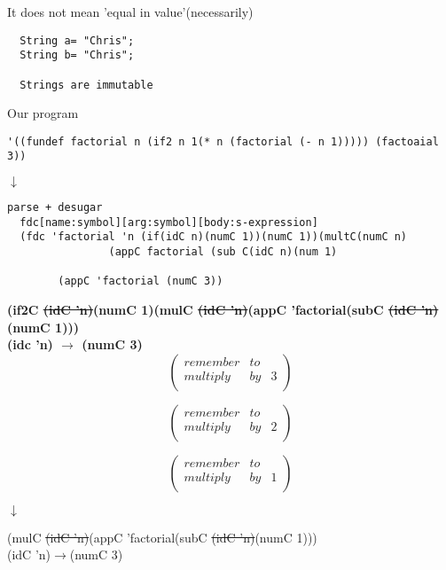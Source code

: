 \documentclass{article}
\begin{document}
\doublespacing   
\begin{flushleft}
  It does not mean 'equal in value'(necessarily) 
  \end{flushleft}  
  
  \begin{verbatim}
  String a= "Chris";
  String b= "Chris";
  
  Strings are immutable
  \end{verbatim}
   
    
\begin{flushleft}
Our program
\begin{verbatim}
'((fundef factorial n (if2 n 1(* n (factorial (- n 1))))) (factoaial 3))
\end{verbatim}
\end{flushleft}
$\downarrow$
\begin{verbatim}
parse + desugar
  fdc[name:symbol][arg:symbol][body:s-expression]
  (fdc 'factorial 'n (if(idC n)(numC 1))(numC 1))(multC(numC n)
  				(appC factorial (sub C(idC n)(num 1)
  				
  		(appC 'factorial (numC 3))
\end{verbatim}

\textbf{(if2C \st{(idC 'n)}(numC 1)(mulC \st{(idC 'n)}(appC 'factorial(subC \st{(idC 'n)}(numC 1)))\\
(idc 'n) $\rightarrow$ (numC 3)
}\\


\[ \left( \begin{array}{ccc}
remember & to \\
multiply & by & 3 \\
\end{array} \right)\] 

\[ \left( \begin{array}{ccc}
remember & to \\
multiply & by & 2 \\
\end{array} \right)\]

\[ \left( \begin{array}{ccc}
remember & to \\
multiply & by & 1 \\
\end{array} \right)\] \begin{center}
$\downarrow$
\end{center}

\begin{center}
(mulC \st{(idC 'n)}(appC 'factorial(subC \st{(idC 'n)}(numC 1)))\\
(idC 'n)$\rightarrow$(numC 3)
\end{center}
\end{document}
